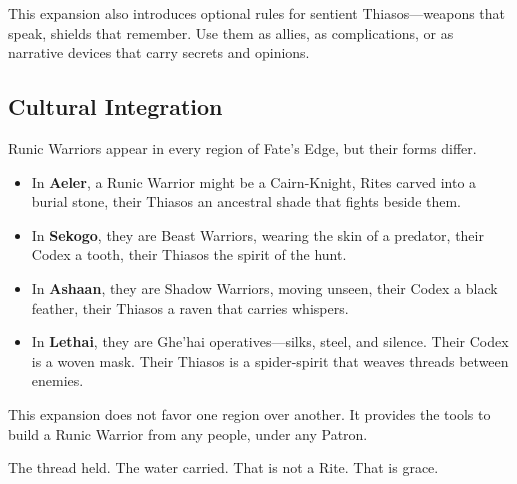This expansion also introduces optional rules for sentient Thiasos—weapons that speak, shields that remember. Use them as allies, as complications, or as narrative devices that carry secrets and opinions.

\subsection{Cultural Integration}

Runic Warriors appear in every region of Fate's Edge, but their forms differ.

\begin{itemize}
\item In \textbf{Aeler}, a Runic Warrior might be a Cairn-Knight, Rites carved into a burial stone, their Thiasos an ancestral shade that fights beside them.
\item In \textbf{Sekogo}, they are Beast Warriors, wearing the skin of a predator, their Codex a tooth, their Thiasos the spirit of the hunt.
\item In \textbf{Ashaan}, they are Shadow Warriors, moving unseen, their Codex a black feather, their Thiasos a raven that carries whispers.
\item In \textbf{Lethai}, they are Ghe'hai operatives—silks, steel, and silence. Their Codex is a woven mask. Their Thiasos is a spider-spirit that weaves threads between enemies.
\end{itemize}

This expansion does not favor one region over another. It provides the tools to build a Runic Warrior from any people, under any Patron.

The thread held. The water carried. That is not a Rite. That is grace.
